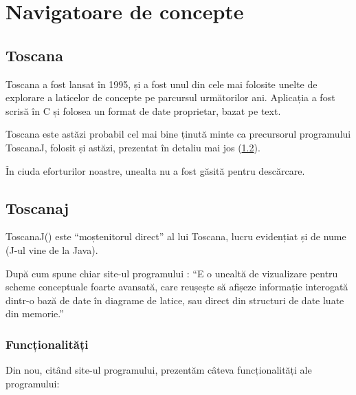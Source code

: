 \documentclass[12pt, a4paper, twoside, romanian]{teza-upb}
\begin{document}
  \section{Navigatoare de concepte}
    \subsection{Toscana}
      Toscana\cite{Vogt:1995:Toscana} a fost lansat în 1995, și a fost unul din cele mai folosite unelte de explorare a laticelor de concepte pe parcursul următorilor ani. Aplicația a fost scrisă în C și folosea un format de date proprietar, bazat pe text.

      Toscana este astăzi probabil cel mai bine ținută minte ca precursorul programului ToscanaJ, folosit și astăzi, prezentat în detaliu mai jos (\ref{subsec:toscanaj}).

      În ciuda eforturilor noastre, unealta nu a fost găsită pentru descărcare.

    \subsection{Toscanaj}
    \label{subsec:toscanaj}
      ToscanaJ(\cite{Toscanaj:homepage}) este ``moștenitorul direct'' al lui Toscana, lucru evidențiat și de nume (J-ul vine de la Java).

      După cum spune chiar site-ul programului \cite{Toscanaj:toscanaj}: ``E o unealtă de vizualizare pentru scheme conceptuale foarte avansată, care reușește să afișeze informație interogată dintr-o bază de date în diagrame de latice, sau direct din structuri de date luate din memorie.''
      \subsubsection{Funcționalități}
      \label{subsubsec:toscanaj-functionalitati}
      
        Din nou, citând site-ul programului\cite{Toscanaj:toscanaj}, prezentăm câteva funcționalități ale programului:
\end{document}
